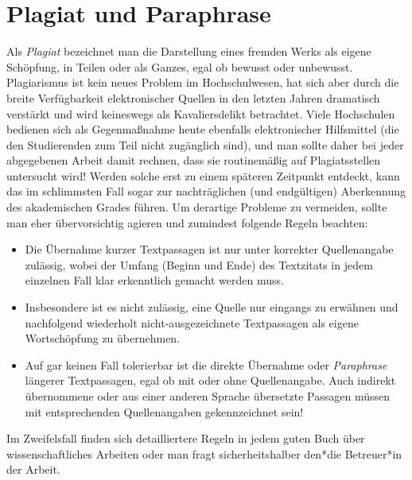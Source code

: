 \section{Plagiat und Paraphrase}
\label{sec:Plagiarismus}

Als \emph{Plagiat} bezeichnet man die Darstellung eines fremden Werks als
eigene Schöpfung, in Teilen oder als Ganzes, egal ob bewusst oder unbewusst.
Plagiarismus ist kein neues Problem im Hochschulwesen, hat sich aber durch
die breite Verfügbarkeit elektronischer Quellen in den letzten Jahren
dramatisch verstärkt und wird keineswegs als Kavaliersdelikt betrachtet.
Viele Hochschulen bedienen sich als Gegenmaßnahme heute ebenfalls
elektronischer Hilfsmittel (die den Studierenden zum Teil nicht zugänglich
sind), und man sollte daher bei jeder abgegebenen Arbeit damit rechnen, dass
sie routinemäßig auf Plagiatsstellen untersucht wird! Werden solche erst zu
einem späteren Zeitpunkt entdeckt, kann das im schlimmsten Fall sogar zur
nachträglichen (und endgültigen) Aberkennung des akademischen Grades führen.
Um derartige Probleme zu vermeiden, sollte man eher übervorsichtig agieren
und zumindest folgende Regeln beachten:
%
\begin{itemize}
    \item
    Die Übernahme kurzer Textpassagen ist nur unter korrekter Quellenangabe
    zulässig, wobei der Umfang (Beginn und Ende) des Textzitats in jedem
    einzelnen Fall klar erkenntlich gemacht werden muss.
    \item
    Insbesondere ist es nicht zulässig, eine Quelle nur eingangs zu erwähnen
    und nachfolgend wiederholt nicht-ausgezeichnete Textpassagen als eigene
    Wortschöpfung zu übernehmen.
    \item
    Auf gar keinen Fall tolerierbar ist die direkte Übernahme oder
    \emph{Paraphrase} längerer Textpassagen, egal ob mit oder ohne
    Quellenangabe. Auch indirekt übernommene oder aus einer anderen Sprache
    übersetzte Passagen müssen mit entsprechenden Quellenangaben
    gekennzeichnet sein!
\end{itemize}
%
Im Zweifelsfall finden sich detailliertere Regeln in jedem guten Buch über
wissenschaftliches Arbeiten oder man fragt sicherheitshalber den*die
Betreuer*in der Arbeit.
